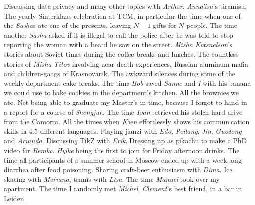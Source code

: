 Discussing data privacy and many other topics with \emph{Arthur}. \emph{Annalisa}'s tiramisu. The yearly Sinterklaas celebration at TCM, in particular the time when one of the \emph{Sasha}s ate one of the presents, leaving $N-1$ gifts for $N$ people. The time another \emph{Sasha} asked if it is illegal to call the police after he was told to stop reporting the woman with a beard he saw on the street. \emph{Misha Katsnelson}'s stories about Soviet times during the coffee breaks and lunches. The countless stories of \emph{Misha Titov} involving near-death experiences, Russian aluminum mafia and children-gangs of Krasnoyarsk. The awkward silences during some of the weekly department cake breaks. The time \emph{Bob} saved \emph{Sanne} and \emph{I} with his banana we could use to bake cookies in the department's kitchen. All the brownies we ate. Not being able to graduate my Master's in time, because I forgot to hand in a report for a course of \emph{Shengjun}.
The time \emph{Ivan} retrieved his stolen hard drive from the Camorra. All the times when \emph{Koen} effortlessly shows his communication skills in 4.5 different languages. Playing jianzi with \emph{Edo}, \emph{Peilang}, \emph{Jin}, \emph{Guodong} and \emph{Amanda}. Discussing TikZ with \emph{Erik}. 
Dressing up as pikachu to make a PhD video for \emph{Remko}. \emph{Hylke} being the first to join for Friday afternoon drinks. The time all participants of a summer school in Moscow ended up with a week long diarrhea after food poisoning. Sharing craft-beer enthusiasm with \emph{Dima}. Ice skating with \emph{Mariana}, tennis with \emph{Lisa}. The time \emph{Manuel} took over my apartment. The time I randomly met \emph{Michel}, \emph{Clement}'s best friend, in a bar in Leiden.  


